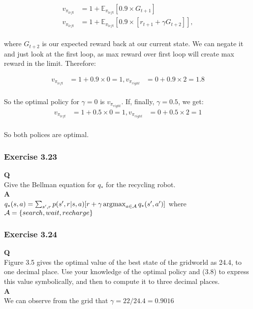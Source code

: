 \begin{align}
v_{\pi_{left}} &= 1 + \mathbb{E}_{\pi_{left}} \left[0.9 \times G_{t+1} \right] \\
v_{\pi_{left}} &= 1 + \mathbb{E}_{\pi_{left}} \left[0.9 \times [r_{t+1} + \gamma G_{t+2}] \right], \\ 
\end{align}

where $G_{t+2}$ is our expected reward back at our current state. We can negate it and just look at the first loop, as max reward over first loop will create max reward in the limit. Therefore:

\begin{align}
v_{\pi_{left}} &= 1 + 0.9 \times 0 = 1,
v_{\pi_{right}} &= 0 + 0.9 \times 2 = 1.8 \\ 
\end{align}

So the optimal policy for $\gamma = 0$ is $v_{\pi_{right}}$. If, finally, $\gamma = 0.5$, we get:
\begin{align}
v_{\pi_{left}} &= 1 + 0.5 \times 0 = 1,
v_{\pi_{right}} &= 0 + 0.5 \times 2 = 1 \\ 
\end{align}

So both polices are optimal.

\subsubsection{Exercise 3.23}
\textbf{Q}\\
Give the Bellman equation for $q_*$ for the recycling robot.\\

\textbf{A}\\
$
q_*(s,a) =  \sum_{s',r} p(s',r | s, a) [r + \gamma \operatorname*{\arg\!\max}_{a \in \mathcal{A}} q_*(s', a')]
$
where $\mathcal{A} = \{\mathnormal{search}, \mathnormal{wait}, \mathnormal{recharge}\}$

\subsubsection{Exercise 3.24}
\textbf{Q}\\
Figure 3.5 gives the optimal value of the best state of the gridworld as 24.4, to one decimal place. Use your knowledge of the optimal policy and (3.8) to express this value symbolically, and then to compute it to three decimal places.\\

\textbf{A}\\
We can observe from the grid that $\gamma = 22/24.4 = 0.9016$

